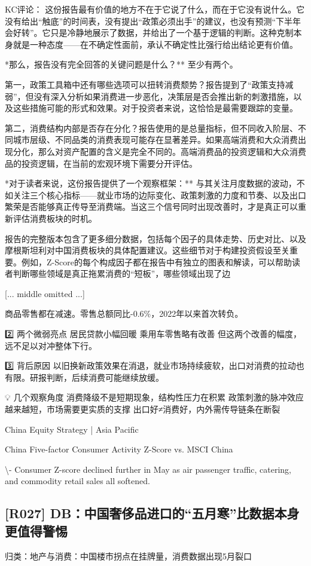 \documentclass[11pt]{ctexart}
\begin{document}
KC评论： 这份报告最有价值的地方不在于它说了什么，而在于它没有说什么。它没有给出“触底”的时间表，没有提出“政策必须出手”的建议，也没有预测“下半年会好转”。它只是冷静地展示了数据，并给出了一个基于逻辑的判断。这种克制本身就是一种态度——在不确定性面前，承认不确定性比强行给出结论更有价值。

*那么，报告没有完全回答的关键问题是什么？** 至少有两个。

第一，政策工具箱中还有哪些选项可以扭转消费颓势？报告提到了“政策支持减弱”，但没有深入分析如果消费进一步恶化，决策层是否会推出新的刺激措施，以及这些措施可能的形式和效果。对于投资者来说，这恰恰是最需要跟踪的变量。

第二，消费结构内部是否存在分化？报告使用的是总量指标，但不同收入阶层、不同城市层级、不同品类的消费表现可能存在显著差异。如果高端消费和大众消费出现分化，那么对资产配置的含义是完全不同的。高端消费品的投资逻辑和大众消费品的投资逻辑，在当前的宏观环境下需要分开评估。

*对于读者来说，这份报告提供了一个观察框架：** 与其关注月度数据的波动，不如关注三个核心指标——就业市场的边际变化、政策刺激的力度和节奏、以及出口繁荣是否能够真正传导至消费端。当这三个信号同时出现改善时，才是真正可以重新评估消费板块的时机。

报告的完整版本包含了更多细分数据，包括每个因子的具体走势、历史对比、以及摩根斯坦利对中国消费板块的具体配置建议。这些细节对于构建投资假设至关重要。例如，Z-Score的每个构成因子都在报告中有独立的图表和解读，可以帮助读者判断哪些领域是真正拖累消费的“短板”，哪些领域出现了边

[... middle omitted ...]

商品零售都在减速。零售总额同比-0.6\%，2022年以来首次转负。

2️⃣ 两个微弱亮点 居民贷款小幅回暖 乘用车零售略有改善 但这两个改善的幅度，远不足以对冲整体下行。

3️⃣ 背后原因 以旧换新政策效果在消退，就业市场持续疲软，出口对消费的拉动也有限。研报判断，后续消费可能继续放缓。

💡 几个观察角度 消费降级不是短期现象，结构性压力在积累 政策刺激的脉冲效应越来越短，市场需要更实质的支撑 出口好≠消费好，内外需传导链条在断裂

China Equity Strategy | Asia Pacific

China Five-factor Consumer Activity Z-Score vs. MSCI China

\textbackslash{}- Consumer Z-score declined further in May as air passenger traffic, catering, and commodity retail sales all softened.

\subsection{[R027] DB：中国奢侈品进口的“五月寒”比数据本身更值得警惕}
{\small\color{refgray}归类：地产与消费：中国楼市拐点在挂牌量，消费数据出现5月裂口}
\end{document}
